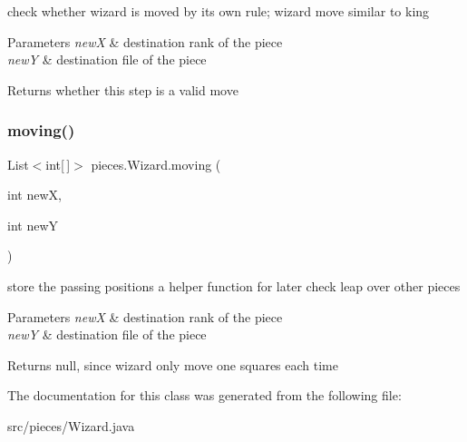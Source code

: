check whether wizard is moved by its own rule; wizard move similar to king 
\begin{DoxyParams}{Parameters}
{\em newX} & destination rank of the piece \\
\hline
{\em newY} & destination file of the piece \\
\hline
\end{DoxyParams}
\begin{DoxyReturn}{Returns}
whether this step is a valid move 
\end{DoxyReturn}
\mbox{\label{classpieces_1_1_wizard_a477ebc0284c9c2a16513a7a7c9dc224e}} 
\subsubsection{\texorpdfstring{moving()}{moving()}}
{\footnotesize\ttfamily List$<$int\mbox{[}$\,$\mbox{]}$>$ pieces.\+Wizard.\+moving (\begin{DoxyParamCaption}\item[{int}]{newX,  }\item[{int}]{newY }\end{DoxyParamCaption})\hspace{0.3cm}{\ttfamily [inline]}}

store the passing positions a helper function for later check leap over other pieces 
\begin{DoxyParams}{Parameters}
{\em newX} & destination rank of the piece \\
\hline
{\em newY} & destination file of the piece \\
\hline
\end{DoxyParams}
\begin{DoxyReturn}{Returns}
null, since wizard only move one squares each time 
\end{DoxyReturn}


The documentation for this class was generated from the following file\+:\begin{DoxyCompactItemize}
\item 
src/pieces/Wizard.\+java\end{DoxyCompactItemize}
